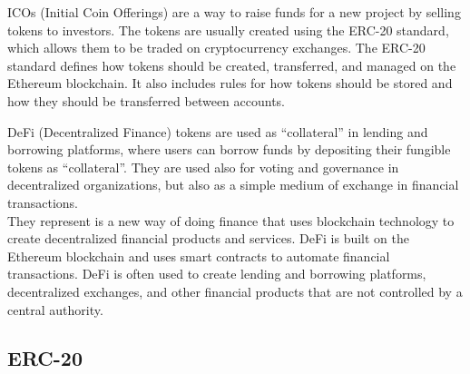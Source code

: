 ICOs (Initial Coin Offerings) are a way to raise funds for a new project by selling tokens to investors. The tokens are usually created using the ERC-20 standard, which allows them to be traded on cryptocurrency exchanges. The ERC-20 standard defines how tokens should be created, transferred, and managed on the Ethereum blockchain. It also includes rules for how tokens should be stored and how they should be transferred between accounts.

DeFi (Decentralized Finance) tokens are used as ``collateral'' in lending and borrowing platforms, where users can borrow
funds by depositing their fungible tokens as ``collateral''.
They are used also for voting and governance in decentralized organizations, but also as a simple medium of exchange in financial transactions.\\ 
They represent  is a new way of doing finance that uses blockchain technology to create decentralized financial products and services. DeFi is built on the Ethereum blockchain and uses smart contracts to automate financial transactions. DeFi is often used to create lending and borrowing platforms, decentralized exchanges, and other financial products that are not controlled by a central authority.

\subsection{ERC-20}


